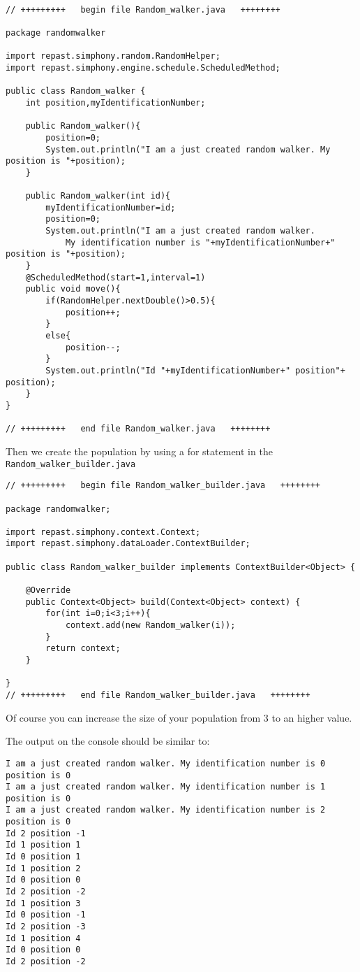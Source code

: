 \documentclass{article}
\begin{document}
\begin{verbatim}

// +++++++++   begin file Random_walker.java   ++++++++

package randomwalker

import repast.simphony.random.RandomHelper;
import repast.simphony.engine.schedule.ScheduledMethod;

public class Random_walker {
	int position,myIdentificationNumber;
	
	public Random_walker(){
		position=0;
		System.out.println("I am a just created random walker. My position is "+position);
	}

	public Random_walker(int id){
		myIdentificationNumber=id;
		position=0;
		System.out.println("I am a just created random walker. 
		    My identification number is "+myIdentificationNumber+" position is "+position);
	}
	@ScheduledMethod(start=1,interval=1)
	public void move(){
		if(RandomHelper.nextDouble()>0.5){
			position++;
		}
		else{
			position--;
		}
		System.out.println("Id "+myIdentificationNumber+" position"+ position);
	}
}

// +++++++++   end file Random_walker.java   ++++++++
\end{verbatim}


Then we create the population by using a for statement in the \verb+Random_walker_builder.java+

\begin{verbatim}
// +++++++++   begin file Random_walker_builder.java   ++++++++

package randomwalker;

import repast.simphony.context.Context;
import repast.simphony.dataLoader.ContextBuilder;

public class Random_walker_builder implements ContextBuilder<Object> {

	@Override
	public Context<Object> build(Context<Object> context) {
		for(int i=0;i<3;i++){
			context.add(new Random_walker(i));
		}
		return context;
	}

}
// +++++++++   end file Random_walker_builder.java   ++++++++
\end{verbatim}

Of course you can increase the size of your population from 3 to an higher value.

The output on the console should be similar to:

\begin{verbatim}
I am a just created random walker. My identification number is 0 position is 0
I am a just created random walker. My identification number is 1 position is 0
I am a just created random walker. My identification number is 2 position is 0
Id 2 position -1
Id 1 position 1
Id 0 position 1
Id 1 position 2
Id 0 position 0
Id 2 position -2
Id 1 position 3
Id 0 position -1
Id 2 position -3
Id 1 position 4
Id 0 position 0
Id 2 position -2
\end{verbatim}
\end{document}
